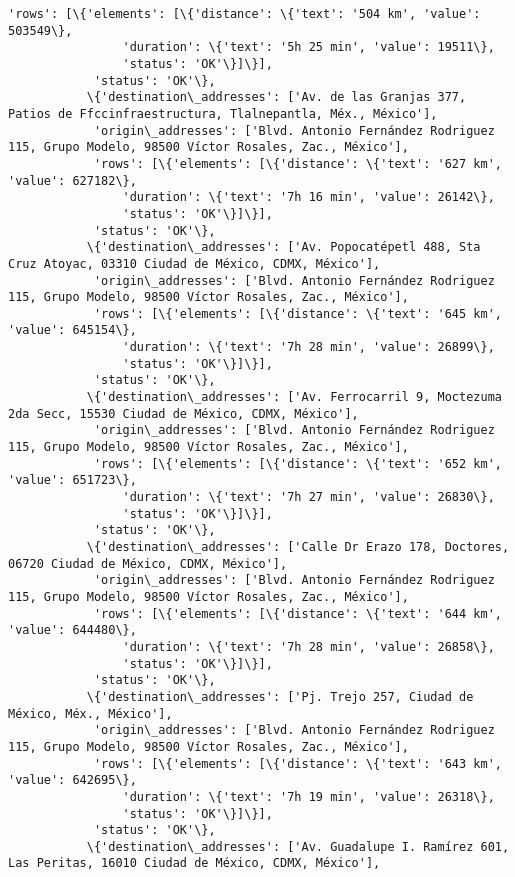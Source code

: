 \documentclass[11pt]{article}
\begin{document}
\begin{Verbatim}[commandchars=\\\{\}]
            'rows': [\{'elements': [\{'distance': \{'text': '504 km', 'value': 503549\},
                'duration': \{'text': '5h 25 min', 'value': 19511\},
                'status': 'OK'\}]\}],
            'status': 'OK'\},
           \{'destination\_addresses': ['Av. de las Granjas 377, Patios de Ffccinfraestructura, Tlalnepantla, Méx., México'],
            'origin\_addresses': ['Blvd. Antonio Fernández Rodriguez 115, Grupo Modelo, 98500 Víctor Rosales, Zac., México'],
            'rows': [\{'elements': [\{'distance': \{'text': '627 km', 'value': 627182\},
                'duration': \{'text': '7h 16 min', 'value': 26142\},
                'status': 'OK'\}]\}],
            'status': 'OK'\},
           \{'destination\_addresses': ['Av. Popocatépetl 488, Sta Cruz Atoyac, 03310 Ciudad de México, CDMX, México'],
            'origin\_addresses': ['Blvd. Antonio Fernández Rodriguez 115, Grupo Modelo, 98500 Víctor Rosales, Zac., México'],
            'rows': [\{'elements': [\{'distance': \{'text': '645 km', 'value': 645154\},
                'duration': \{'text': '7h 28 min', 'value': 26899\},
                'status': 'OK'\}]\}],
            'status': 'OK'\},
           \{'destination\_addresses': ['Av. Ferrocarril 9, Moctezuma 2da Secc, 15530 Ciudad de México, CDMX, México'],
            'origin\_addresses': ['Blvd. Antonio Fernández Rodriguez 115, Grupo Modelo, 98500 Víctor Rosales, Zac., México'],
            'rows': [\{'elements': [\{'distance': \{'text': '652 km', 'value': 651723\},
                'duration': \{'text': '7h 27 min', 'value': 26830\},
                'status': 'OK'\}]\}],
            'status': 'OK'\},
           \{'destination\_addresses': ['Calle Dr Erazo 178, Doctores, 06720 Ciudad de México, CDMX, México'],
            'origin\_addresses': ['Blvd. Antonio Fernández Rodriguez 115, Grupo Modelo, 98500 Víctor Rosales, Zac., México'],
            'rows': [\{'elements': [\{'distance': \{'text': '644 km', 'value': 644480\},
                'duration': \{'text': '7h 28 min', 'value': 26858\},
                'status': 'OK'\}]\}],
            'status': 'OK'\},
           \{'destination\_addresses': ['Pj. Trejo 257, Ciudad de México, Méx., México'],
            'origin\_addresses': ['Blvd. Antonio Fernández Rodriguez 115, Grupo Modelo, 98500 Víctor Rosales, Zac., México'],
            'rows': [\{'elements': [\{'distance': \{'text': '643 km', 'value': 642695\},
                'duration': \{'text': '7h 19 min', 'value': 26318\},
                'status': 'OK'\}]\}],
            'status': 'OK'\},
           \{'destination\_addresses': ['Av. Guadalupe I. Ramírez 601, Las Peritas, 16010 Ciudad de México, CDMX, México'],

\end{Verbatim}
\end{document}
